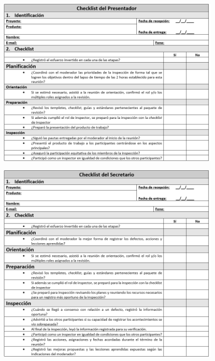 \begin{figure}[H]
\centering
\includegraphics[width=1\textwidth]{figures/anexos/4-4.PNG}
\end{figure}

\begin{figure}[H]
\centering
\includegraphics[width=1\textwidth]{figures/anexos/4-5.PNG}
\end{figure}

